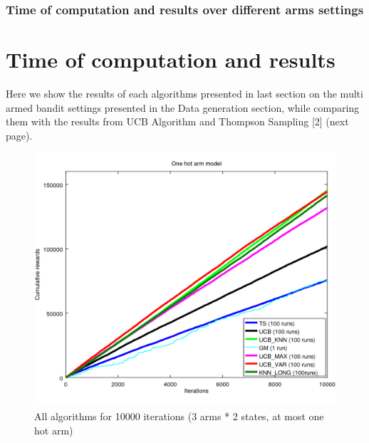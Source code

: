 \documentclass[french]{beamer}
\begin{document}
\begin{frame}
	\frametitle{Time of computation and results over different arms settings}
	
	\section{Time of computation and results}
	
	Here we show the results of each algorithms presented in last section on the multi
	armed bandit settings presented in the Data generation section, while comparing them
	with the results from UCB Algorithm and Thompson Sampling [2] (next page).
	
	\begin{figure}[h]
		\begin{center}
			\includegraphics[width=1.0\textwidth]{all_10000it.png}
		\end{center}
		\caption{All algorithms for 10000 iterations (3 arms * 2 states, at most one hot arm)}
	\end{figure}
	

\end{frame}
\end{document}
